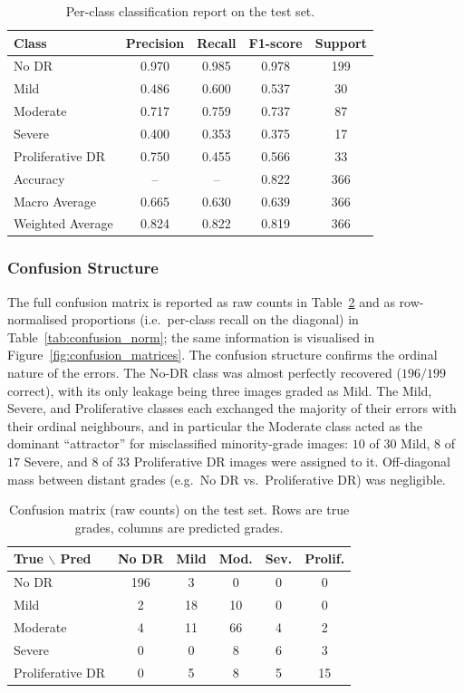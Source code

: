 \begin{table}[H]
\centering
\caption{Per-class classification report on the test set.}
\label{tab:classification_report}
\begin{tabular}{lcccc}
\toprule
Class & Precision & Recall & F1-score & Support \\
\midrule
No DR            & 0.970 & 0.985 & 0.978 & 199 \\
Mild             & 0.486 & 0.600 & 0.537 &  30 \\
Moderate         & 0.717 & 0.759 & 0.737 &  87 \\
Severe           & 0.400 & 0.353 & 0.375 &  17 \\
Proliferative DR & 0.750 & 0.455 & 0.566 &  33 \\
\midrule
Accuracy         & --    & --    & 0.822 & 366 \\
Macro Average    & 0.665 & 0.630 & 0.639 & 366 \\
Weighted Average & 0.824 & 0.822 & 0.819 & 366 \\
\bottomrule
\end{tabular}
\end{table}

\subsubsection{Confusion Structure}
\label{subsubsec:confusion}

The full confusion matrix is reported as raw counts in
Table~\ref{tab:confusion_raw} and as row-normalised proportions (i.e.\ per-class
recall on the diagonal) in Table~\ref{tab:confusion_norm}; the same information is
visualised in Figure~\ref{fig:confusion_matrices}. The confusion structure confirms
the ordinal nature of the errors. The No-DR class was almost perfectly recovered
($196/199$ correct), with its only leakage being three images graded as Mild. The
Mild, Severe, and Proliferative classes each exchanged the majority of their errors
with their ordinal neighbours, and in particular the Moderate class acted as the
dominant ``attractor'' for misclassified minority-grade images: $10$ of $30$ Mild,
$8$ of $17$ Severe, and $8$ of $33$ Proliferative DR images were assigned to it.
Off-diagonal mass between distant grades (e.g.\ No DR vs.\ Proliferative DR) was
negligible.

\begin{table}[H]
\centering
\caption{Confusion matrix (raw counts) on the test set. Rows are true grades,
columns are predicted grades.}
\label{tab:confusion_raw}
\begin{tabular}{lccccc}
\toprule
True $\backslash$ Pred & No DR & Mild & Mod. & Sev. & Prolif. \\
\midrule
No DR            & 196 &  3 &  0 & 0 &  0 \\
Mild             &   2 & 18 & 10 & 0 &  0 \\
Moderate         &   4 & 11 & 66 & 4 &  2 \\
Severe           &   0 &  0 &  8 & 6 &  3 \\
Proliferative DR &   0 &  5 &  8 & 5 & 15 \\
\bottomrule
\end{tabular}
\end{table}

